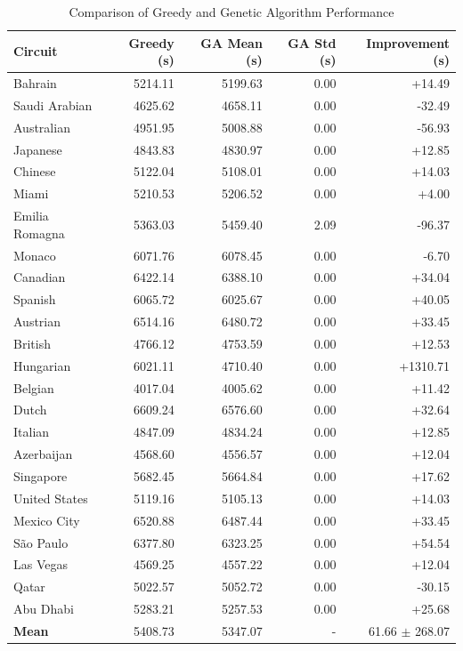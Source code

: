 \begin{table}[htbp]
\centering
\caption{Comparison of Greedy and Genetic Algorithm Performance}
\label{tab:results}
\begin{tabular}{lrrrr}
\hline
\textbf{Circuit} & \textbf{Greedy (s)} & \textbf{GA Mean (s)} & \textbf{GA Std (s)} & \textbf{Improvement (s)} \\
\hline
Bahrain & 5214.11 & 5199.63 & 0.00 & +14.49 \\
Saudi Arabian & 4625.62 & 4658.11 & 0.00 & -32.49 \\
Australian & 4951.95 & 5008.88 & 0.00 & -56.93 \\
Japanese & 4843.83 & 4830.97 & 0.00 & +12.85 \\
Chinese & 5122.04 & 5108.01 & 0.00 & +14.03 \\
Miami & 5210.53 & 5206.52 & 0.00 & +4.00 \\
Emilia Romagna & 5363.03 & 5459.40 & 2.09 & -96.37 \\
Monaco & 6071.76 & 6078.45 & 0.00 & -6.70 \\
Canadian & 6422.14 & 6388.10 & 0.00 & +34.04 \\
Spanish & 6065.72 & 6025.67 & 0.00 & +40.05 \\
Austrian & 6514.16 & 6480.72 & 0.00 & +33.45 \\
British & 4766.12 & 4753.59 & 0.00 & +12.53 \\
Hungarian & 6021.11 & 4710.40 & 0.00 & +1310.71 \\
Belgian & 4017.04 & 4005.62 & 0.00 & +11.42 \\
Dutch & 6609.24 & 6576.60 & 0.00 & +32.64 \\
Italian & 4847.09 & 4834.24 & 0.00 & +12.85 \\
Azerbaijan & 4568.60 & 4556.57 & 0.00 & +12.04 \\
Singapore & 5682.45 & 5664.84 & 0.00 & +17.62 \\
United States & 5119.16 & 5105.13 & 0.00 & +14.03 \\
Mexico City & 6520.88 & 6487.44 & 0.00 & +33.45 \\
São Paulo & 6377.80 & 6323.25 & 0.00 & +54.54 \\
Las Vegas & 4569.25 & 4557.22 & 0.00 & +12.04 \\
Qatar & 5022.57 & 5052.72 & 0.00 & -30.15 \\
Abu Dhabi & 5283.21 & 5257.53 & 0.00 & +25.68 \\
\hline
\textbf{Mean} & 5408.73 & 5347.07 & - & 61.66 $\pm$ 268.07 \\
\hline
\end{tabular}
\end{table}
